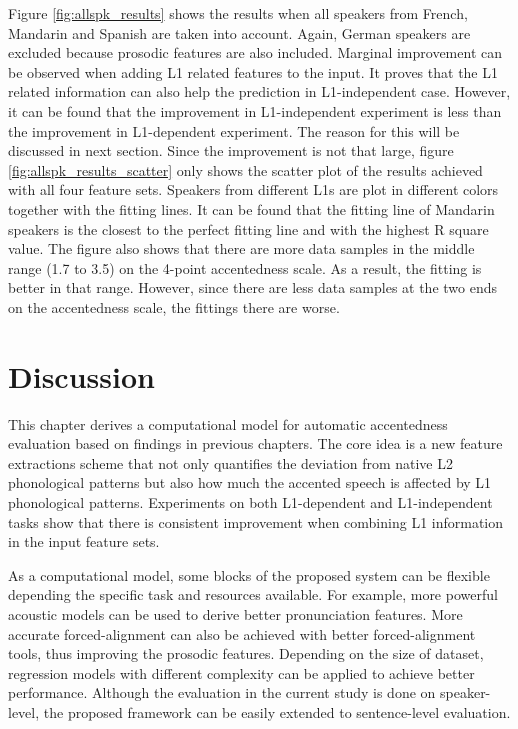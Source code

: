 Figure \ref{fig:allspk_results} shows the results when all speakers from French, Mandarin and Spanish are taken into account. Again, German speakers are excluded because prosodic features are also included. Marginal improvement can be observed when adding L1 related features to the input. It proves that the L1 related information can also help the prediction in L1-independent case. However, it can be found that the improvement in L1-independent experiment is less than the improvement in L1-dependent experiment. The reason for this will be discussed in next section. Since the improvement is not that large, figure \ref{fig:allspk_results_scatter} only shows the scatter plot of the results achieved with all four feature sets. Speakers from different L1s are plot in different colors together with the fitting lines. It can be found that the fitting line of Mandarin speakers is the closest to the perfect fitting line and with the highest R square value. The figure also shows that there are more data samples in the middle range (1.7 to 3.5) on the 4-point accentedness scale. As a result, the fitting is better in that range. However, since there are less data samples at the two ends on the accentedness scale, the fittings there are worse.

\section{Discussion}

This chapter derives a computational model for automatic accentedness evaluation based on findings in previous chapters. The core idea is a new feature extractions scheme that not only quantifies the deviation from native L2 phonological patterns but also how much the accented speech is affected by L1 phonological patterns. Experiments on both L1-dependent and L1-independent tasks show that there is consistent improvement when combining L1 information in the input feature sets.

As a computational model, some blocks of the proposed system can be flexible depending the specific task and resources available. For example, more powerful acoustic models can be used to derive better pronunciation features. More accurate forced-alignment can also be achieved with better forced-alignment tools, thus improving the prosodic features. Depending on the size of dataset, regression models with different complexity can be applied to achieve better performance. Although the evaluation in the current study is done on speaker-level, the proposed framework can be easily extended to sentence-level evaluation.

